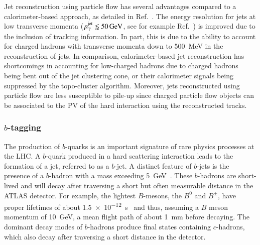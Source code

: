 Jet reconstruction using particle flow has several advantages compared to a
calorimeter-based approach, as detailed in Ref.~\cite{PERF-2015-09}. The energy
resolution for jets at low transverse momenta
($p_{\text{T}}^{\text{jet}} \lessapprox \SI{50}{\ensuremath{\text{GeV}}}$, see for example
Ref.~\cite{JETM-2018-05}) is improved due to the inclusion of tracking
information. In part, this is due to the ability to account for charged hadrons
with transverse momenta down to \SI{500}{\MeV} in the reconstruction of jets. In
comparison, calorimeter-based jet reconstruction has shortcomings in accounting
for low-\pT charged hadrons due to charged hadrons being bent out of the jet
clustering cone, or their calorimeter signals being suppressed by the
topo-cluster algorithm. Moreover, jets reconstructed using particle flow are
less susceptible to pile-up since charged particle flow objects can be
associated to the PV of the hard interaction using the reconstructed tracks.


\subsubsection{$b$-tagging}

The production of $b$-quarks is an important signature of rare physics processes
at the LHC. A $b$-quark produced in a hard scattering interaction leads to the
formation of a jet, referred to as a $b$-jet. A distinct feature of $b$-jets is
the presence of a $b$-hadron with a mass exceeding \SI{5}{\GeV}~\cite{pdg2020}.
These $b$-hadrons are short-lived and will decay after traversing a short but
often measurable distance in the ATLAS detector. For example, the lightest
$B$-mesons, the $B^0$ and $B^\pm$, have proper lifetimes of about
\SI{1.5e-12}{\second}~\cite{pdg2020} and thus, assuming a $B$ meson momentum of
\SI{10}{\GeV}, a mean flight path of about \SI{1}{\milli\metre} before
decaying. The dominant decay modes of $b$-hadrons produce final states
containing $c$-hadrons, which also decay after traversing a short distance in
the detector.

